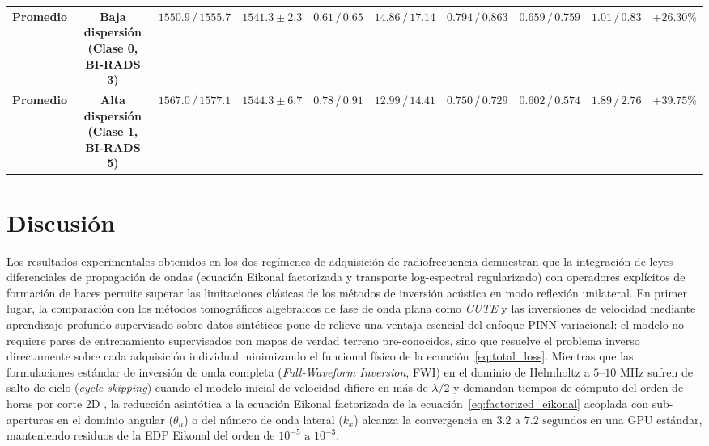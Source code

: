 \documentclass[9pt]{article}
\begin{document}
\begin{table}[t!]
{\begin{tabular}{lccccccccc}
\midrule
\textbf{Promedio} & \textbf{Baja dispersión (Clase 0, BI-RADS 3)} & $\mathbf{1550.9 \,/\, 1555.7}$ & $\mathbf{1541.3 \pm 2.3}$ & $\mathbf{0.61 \,/\, 0.65}$ & $\mathbf{14.86 \,/\, 17.14}$ & $\mathbf{0.794 \,/\, 0.863}$ & $\mathbf{0.659 \,/\, 0.759}$ & $\mathbf{1.01 \,/\, 0.83}$ & $\mathbf{+26.30\%}$ \\
\textbf{Promedio} & \textbf{Alta dispersión (Clase 1, BI-RADS 5)} & $\mathbf{1567.0 \,/\, 1577.1}$ & $\mathbf{1544.3 \pm 6.7}$ & $\mathbf{0.78 \,/\, 0.91}$ & $\mathbf{12.99 \,/\, 14.41}$ & $\mathbf{0.750 \,/\, 0.729}$ & $\mathbf{0.602 \,/\, 0.574}$ & $\mathbf{1.89 \,/\, 2.76}$ & $\mathbf{+39.75\%}$ \\
\bottomrule
\end{tabular}%
}
\end{table}

\section{Discusión}
\label{sec:discusion}

Los resultados experimentales obtenidos en los dos regímenes de adquisición de radiofrecuencia demuestran que la integración de leyes diferenciales de propagación de ondas (ecuación Eikonal factorizada y transporte log-espectral regularizado) con operadores explícitos de formación de haces permite superar las limitaciones clásicas de los métodos de inversión acústica en modo reflexión unilateral. En primer lugar, la comparación con los métodos tomográficos algebraicos de fase de onda plana como \textit{CUTE} \parencite{Jaeger2015, Stahli2020} y las inversiones de velocidad mediante aprendizaje profundo supervisado sobre datos sintéticos \parencite{Feigin2020} pone de relieve una ventaja esencial del enfoque PINN variacional: el modelo no requiere pares de entrenamiento supervisados con mapas de verdad terreno pre-conocidos, sino que resuelve el problema inverso directamente sobre cada adquisición individual minimizando el funcional físico de la ecuación~\eqref{eq:total_loss}. Mientras que las formulaciones estándar de inversión de onda completa (\textit{Full-Waveform Inversion}, FWI) en el dominio de Helmholtz a $5\text{--}10\text{ MHz}$ sufren de salto de ciclo (\textit{cycle skipping}) cuando el modelo inicial de velocidad difiere en más de $\lambda/2$ y demandan tiempos de cómputo del orden de horas por corte 2D \parencite{Virieux2009, Song2021}, la reducción asintótica a la ecuación Eikonal factorizada de la ecuación~\eqref{eq:factorized_eikonal} acoplada con sub-aperturas en el dominio angular ($\theta_n$) o del número de onda lateral ($k_x$) alcanza la convergencia en $3.2\text{ a }7.2\text{ segundos}$ en una GPU estándar, manteniendo residuos de la EDP Eikonal del orden de $10^{-5}\text{ a }10^{-3}$.
\end{document}
